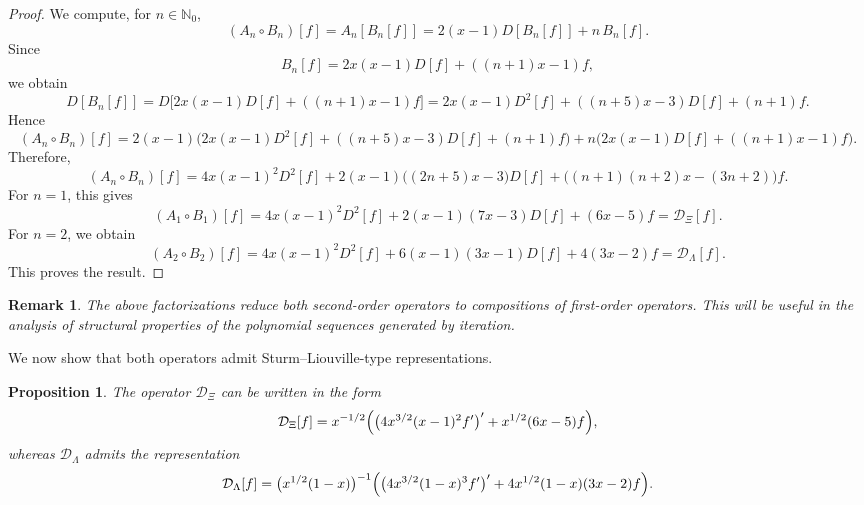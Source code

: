 \documentclass[11pt,twoside]{article}
\newtheorem{proposition}[theorem]{Proposition}
\newtheorem{remark}[theorem]{Remark}
\numberwithin{equation}{section}
\begin{document}
\begin{proof}
We compute, for \(n\in\mathbb{N}_0\),
\[
(A_n\circ B_n)[f]
=
A_n[B_n[f]]
=
2(x-1)D[B_n[f]]+n\,B_n[f].
\]
Since
\[
B_n[f]=2x(x-1)D[f]+((n+1)x-1)f,
\]
we obtain
\[
D[B_n[f]]
=
D\!\bigl[2x(x-1)D[f]+((n+1)x-1)f\bigr]
=
2x(x-1)D^2[f]+((n+5)x-3)D[f]+(n+1)f.
\]
Hence
\[
(A_n\circ B_n)[f]
=
2(x-1)\bigl(2x(x-1)D^2[f]+((n+5)x-3)D[f]+(n+1)f\bigr)
+
n\bigl(2x(x-1)D[f]+((n+1)x-1)f\bigr).
\]
Therefore,
\[
(A_n\circ B_n)[f]
=
4x(x-1)^2D^2[f]
+
2(x-1)\bigl((2n+5)x-3\bigr)D[f]
+
\bigl((n+1)(n+2)x-(3n+2)\bigr)f.
\]
For \(n=1\), this gives
\[
(A_1\circ B_1)[f]
=
4x(x-1)^2D^2[f]
+
2(x-1)(7x-3)D[f]
+
(6x-5)f
=
\mathcal D_{\Xi}[f].
\]
For \(n=2\), we obtain
\[
(A_2\circ B_2)[f]
=
4x(x-1)^2D^2[f]
+
6(x-1)(3x-1)D[f]
+
4(3x-2)f
=
\mathcal D_{\Lambda}[f].
\]
This proves the result.
\end{proof}

\begin{remark}
The above factorizations reduce both second-order operators to compositions of first-order operators. This will be useful in the analysis of structural properties of the polynomial sequences generated by iteration.
\end{remark}

\vspace{0.2cm}

We now show that both operators admit Sturm--Liouville-type representations.

\begin{proposition}\label{prop:weighted-form}
The operator \(\mathcal D_{\Xi}\) can be written in the form
\[
\mathcal D_{\Xi}[f]
=
x^{-1/2}
\Bigl(
\bigl(4x^{3/2}(x-1)^2f'\bigr)'
+
x^{1/2}(6x-5)f
\Bigr),
\]
whereas \(\mathcal D_{\Lambda}\) admits the representation
\[
\mathcal D_{\Lambda}[f]
=
\bigl(x^{1/2}(1-x)\bigr)^{-1}
\Bigl(
\bigl(4x^{3/2}(1-x)^3f'\bigr)'
+
4x^{1/2}(1-x)(3x-2)f
\Bigr).
\]
\end{proposition}
\end{document}
